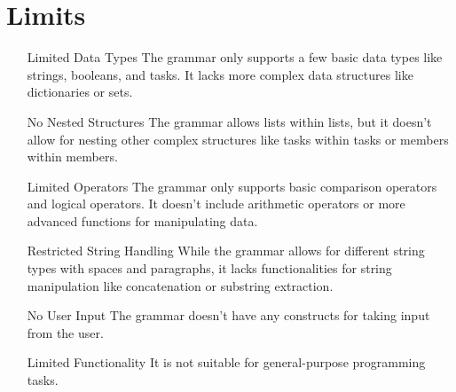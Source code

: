 \section{Limits}
\label{sec:limits}

\begin{enumerate}
	\item [Limited Data Types] The grammar only supports a few basic data types like strings, booleans, and tasks. It lacks more complex data structures like dictionaries or sets.
	\item [No Nested Structures] The grammar allows lists within lists, but it doesn't allow for nesting other complex structures like tasks within tasks or members within members.
	\item [Limited Operators] The grammar only supports basic comparison operators and logical operators. It doesn't include arithmetic operators or more advanced functions for manipulating data.
	\item [Restricted String Handling] While the grammar allows for different string types with spaces and paragraphs, it lacks functionalities for string manipulation like concatenation or substring extraction.
	\item [No User Input] The grammar doesn't have any constructs for taking input from the user.
	\item [Limited Functionality] It is not suitable for general-purpose programming tasks.
\end{enumerate}

